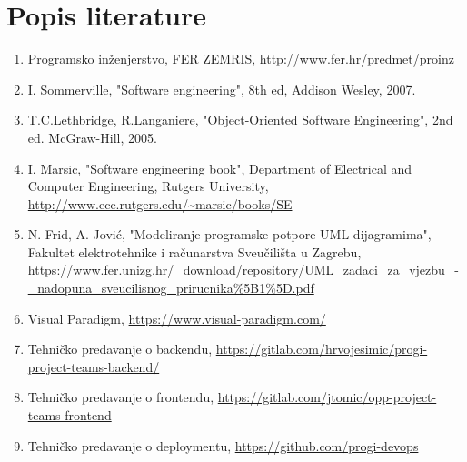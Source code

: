 \chapter*{Popis literature}
		
		\begin{enumerate}
			
			\item  Programsko inženjerstvo, FER ZEMRIS, \url{http://www.fer.hr/predmet/proinz}
			
			\item  I. Sommerville, "Software engineering", 8th ed, Addison Wesley, 2007.
			
			\item  T.C.Lethbridge, R.Langaniere, "Object-Oriented Software Engineering", 2nd ed. McGraw-Hill, 2005.
			
			\item  I. Marsic, "Software engineering book", Department of Electrical and Computer Engineering, Rutgers University, \url{http://www.ece.rutgers.edu/~marsic/books/SE}

			\item  N. Frid, A. Jović, "Modeliranje programske potpore UML-dijagramima", Fakultet elektrotehnike i računarstva Sveučilišta u Zagrebu, \url{https://www.fer.unizg.hr/_download/repository/UML_zadaci_za_vjezbu_-_nadopuna_sveucilisnog_prirucnika%5B1%5D.pdf}

			\item  Visual Paradigm, \url{https://www.visual-paradigm.com/}
			
			\item  Tehničko predavanje o backendu, \url{https://gitlab.com/hrvojesimic/progi-project-teams-backend/}
			
			\item  Tehničko predavanje o frontendu, \url{https://gitlab.com/jtomic/opp-project-teams-frontend}
			
			\item  Tehničko predavanje o deploymentu, \url{https://github.com/progi-devops}

		\end{enumerate}
		
		 